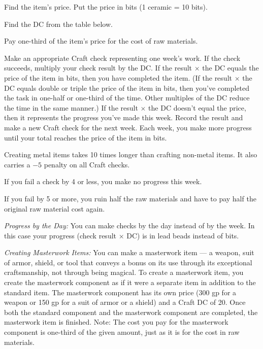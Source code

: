 \begin{enumerate*}
\item Find the item's price. Put the price in bits (1 ceramic = 10 bits).
\item Find the DC from the table below.
\item Pay one-third of the item's price for the cost of raw materials.
\item Make an appropriate Craft check representing one week's work. If the check succeeds, multiply your check result by the DC. If the result $\times$ the DC equals the price of the item in bits, then you have completed the item. (If the result $\times$ the DC equals double or triple the price of the item in bits, then you've completed the task in one-half or one-third of the time. Other multiples of the DC reduce the time in the same manner.) If the result $\times$ the DC doesn't equal the price, then it represents the progress you've made this week. Record the result and make a new Craft check for the next week. Each week, you make more progress until your total reaches the price of the item in bits.
\end{enumerate*}

Creating metal items takes 10 times longer than crafting non-metal items. It also carries a $-5$ penalty on all Craft checks.

If you fail a check by 4 or less, you make no progress this week.

If you fail by 5 or more, you ruin half the raw materials and have to pay half the original raw material cost again.

\textit{Progress by the Day:} You can make checks by the day instead of by the week. In this case your progress (check result $\times$ DC) is in lead beads instead of bits.

\textit{Creating Masterwork Items:} You can make a masterwork item --- a weapon, suit of armor, shield, or tool that conveys a bonus on its use through its exceptional craftsmanship, not through being magical. To create a masterwork item, you create the masterwork component as if it were a separate item in addition to the standard item. The masterwork component has its own price (300 gp for a weapon or 150 gp for a suit of armor or a shield) and a Craft DC of 20. Once both the standard component and the masterwork component are completed, the masterwork item is finished. Note: The cost you pay for the masterwork component is one-third of the given amount, just as it is for the cost in raw materials.

